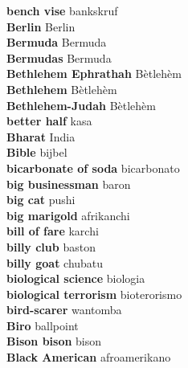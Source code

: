 \textbf{ bench vise  } bankskruf \\
\textbf{ Berlin  } Berlin \\
\textbf{ Bermuda  } Bermuda \\
\textbf{ Bermudas  } Bermuda \\
\textbf{ Bethlehem Ephrathah  } Bètlehèm \\
\textbf{ Bethlehem  } Bètlehèm \\
\textbf{ Bethlehem-Judah  } Bètlehèm \\
\textbf{ better half  } kasa \\
\textbf{ Bharat  } India \\
\textbf{ Bible  } bijbel \\
\textbf{ bicarbonate of soda  } bicarbonato \\
\textbf{ big businessman  } baron \\
\textbf{ big cat  } pushi \\
\textbf{ big marigold  } afrikanchi \\
\textbf{ bill of fare  } karchi \\
\textbf{ billy club  } baston \\
\textbf{ billy goat  } chubatu \\
\textbf{ biological science  } biologia \\
\textbf{ biological terrorism  } bioterorismo \\
\textbf{ bird-scarer  } wantomba \\
\textbf{ Biro  } ballpoint \\
\textbf{ Bison bison  } bison \\
\textbf{ Black American  } afroamerikano \\
